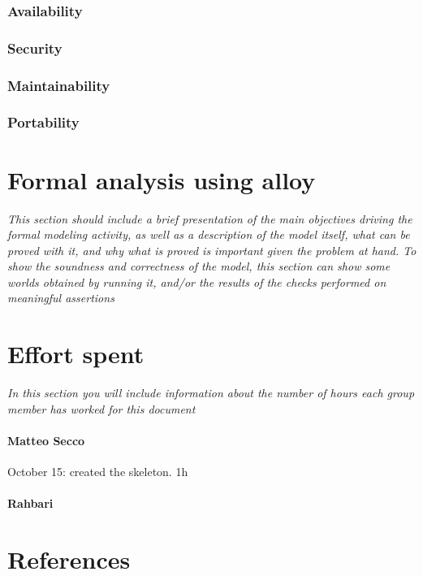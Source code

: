 \documentclass{article}
\begin{document}
		\subsubsection{Availability}
		\subsubsection{Security}
		\subsubsection{Maintainability}
		\subsubsection{Portability}
\section{Formal analysis using alloy} \textit{This section should include a brief presentation of the main objectives driving the formal modeling activity, as well as a description of the model itself, what can be proved with it, and why what is proved is important given the problem at hand. To show the soundness and correctness of the model, this section can show some worlds obtained by running it, and/or the results of the checks performed on meaningful assertions}
\section{Effort spent} \textit{In this section you will include information about the number of hours each group member has worked for this document}
	\paragraph{Matteo Secco} 
		\begin{list}{-}{}
			\item October 15: created the skeleton. 1h
		\end{list}
	\paragraph{Rahbari}
\section{References}
\end{document}
